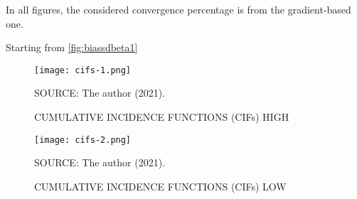 In all figures, the considered convergence percentage is from the
gradient-based one.

Starting from \autoref{fig:biassdbeta1}

\begin{figure}[H]
 \setlength{\abovecaptionskip}{.0001pt}
 \caption{CUMULATIVE INCIDENCE FUNCTIONS (CIFs) HIGH}
 \vspace{0.2cm}\centering
 \texttt{[image: cifs-1.png]}\\
 \begin{footnotesize}
  SOURCE: The author (2021).
 \end{footnotesize}
 \label{fig:cifshigh}
\end{figure}

\begin{figure}[H]
 \setlength{\abovecaptionskip}{.0001pt}
 \caption{CUMULATIVE INCIDENCE FUNCTIONS (CIFs) LOW}
 \vspace{0.2cm}\centering
 \texttt{[image: cifs-2.png]}\\
 \begin{footnotesize}
  SOURCE: The author (2021).
 \end{footnotesize}
 \label{fig:cifslow}
\end{figure}





